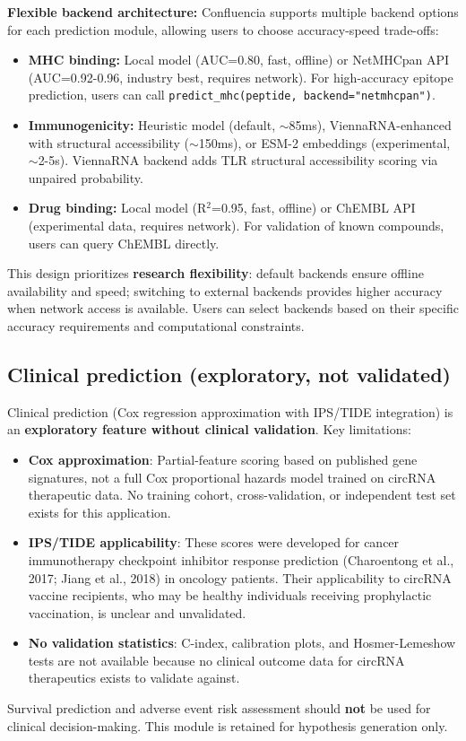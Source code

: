 \textbf{Flexible backend architecture:} Confluencia supports multiple backend options for each prediction module, allowing users to choose accuracy-speed trade-offs:
\begin{itemize}[noitemsep,topsep=0pt]
\item \textbf{MHC binding:} Local model (AUC=0.80, fast, offline) or NetMHCpan API (AUC=0.92-0.96, industry best, requires network). For high-accuracy epitope prediction, users can call \texttt{predict\_mhc(peptide, backend="netmhcpan")}.
\item \textbf{Immunogenicity:} Heuristic model (default, $\sim$85ms), ViennaRNA-enhanced with structural accessibility ($\sim$150ms), or ESM-2 embeddings (experimental, $\sim$2-5s). ViennaRNA backend adds TLR structural accessibility scoring via unpaired probability.
\item \textbf{Drug binding:} Local model (R$^2$=0.95, fast, offline) or ChEMBL API (experimental data, requires network). For validation of known compounds, users can query ChEMBL directly.
\end{itemize}
This design prioritizes \textbf{research flexibility}: default backends ensure offline availability and speed; switching to external backends provides higher accuracy when network access is available. Users can select backends based on their specific accuracy requirements and computational constraints.

\subsection*{Clinical prediction (exploratory, not validated)}
Clinical prediction (Cox regression approximation with IPS/TIDE integration) is an \textbf{exploratory feature without clinical validation}. Key limitations:
\begin{itemize}[noitemsep,topsep=0pt]
\item \textbf{Cox approximation}: Partial-feature scoring based on published gene signatures, not a full Cox proportional hazards model trained on circRNA therapeutic data. No training cohort, cross-validation, or independent test set exists for this application.
\item \textbf{IPS/TIDE applicability}: These scores were developed for cancer immunotherapy checkpoint inhibitor response prediction (Charoentong et al., 2017; Jiang et al., 2018) in oncology patients. Their applicability to circRNA vaccine recipients, who may be healthy individuals receiving prophylactic vaccination, is unclear and unvalidated.
\item \textbf{No validation statistics}: C-index, calibration plots, and Hosmer-Lemeshow tests are not available because no clinical outcome data for circRNA therapeutics exists to validate against.
\end{itemize}
Survival prediction and adverse event risk assessment should \textbf{not} be used for clinical decision-making. This module is retained for hypothesis generation only.

